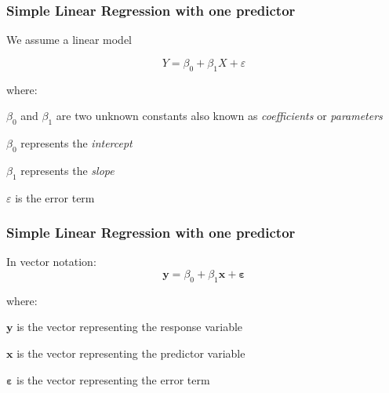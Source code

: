 \documentclass[12pt]{beamer}\usepackage[]{graphicx}\usepackage[]{color}
\begin{document}

\begin{frame}
\frametitle{Simple Linear Regression with one predictor}

We assume a linear model

{\large
$$
Y = \beta_0 + \beta_1 X + \varepsilon
$$
}

where:

\bi
  \item $\beta_0$ and $\beta_1$ are two unknown constants also known 
  as \textit{coefficients} or \textit{parameters}
  \item $\beta_0$ represents the \textit{intercept}
  \item $\beta_1$ represents the \textit{slope}
  \item $\varepsilon$ is the error term
\ei

\end{frame}


\begin{frame}
\frametitle{Simple Linear Regression with one predictor}

In vector notation:
{\large
$$
\mathbf{y} = \beta_0 + \beta_1 \mathbf{x} + \boldsymbol{\varepsilon}
$$
}

where:
\bi
  \item $\mathbf{y}$ is the vector representing the response variable 
  \item $\mathbf{x}$ is the vector representing the predictor variable 
  \item $\boldsymbol{\varepsilon}$ is the vector representing the error term
\ei

\end{frame}

\end{document}
